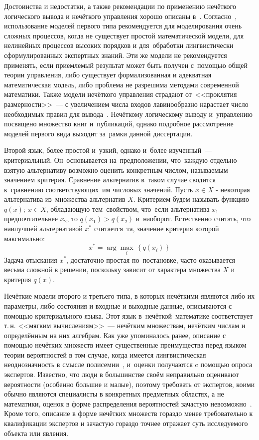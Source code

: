 Достоинства и недостатки, а также рекомендации по применению нечёткого логического вывода и нечёткого управления хорошо описаны в~\cite{Bauer_Winkler}. Согласно~\cite{Bauer_Winkler}, использование моделей первого типа рекомендуется для моделирования очень сложных процессов, когда не существует простой математической модели, для нелинейных процессов высоких порядков и для~обработки лингвистически сформулированных экспертных знаний. Эти же модели не рекомендуется применять, если приемлемый результат может быть получен с~помощью общей теории управления, либо существует формализованная и адекватная математическая модель, либо проблема не разрешима методами современной математики. Также модели нечёткого управления страдают от~<<проклятия размерности>>~--- с увеличением числа входов лавинообразно нарастает число необходимых правил для вывода~\cite{Pegat}. Нечёткому логическому выводу и~управлению посвящено множество книг и~публикаций, однако подробное рассмотрение моделей первого вида выходит за~рамки данной диссертации.

Второй язык, более простой и~узкий, однако и~более изученный~--- критериальный. Он~основывается на~предположении, что~каждую отдельно взятую альтернативу возможно оценить конкретным числом, называемым значением критерия. Сравнение альтернатив в~таком случае сводится к~сравнению соответствующих~им числовых значений. Пусть $x\in X$ - некоторая альтернатива из~множества альтернатив $X$. Критерием будем называть функцию $q\left( x \right);\ x\in X$, обладающую тем~свойством, что~если альтернатива ${x_1}$ предпочтительнее ${x_2}$, то $q\left( x_1 \right)>q\left( x_2 \right)$ и~наоборот. Естественно считать, что наилучшей альтернативой ${{x}^{*}}$ считается~та, значение критерия которой максимально:
\begin{equation*}
  x^{*}=\arg \underset{i}{\mathop{\max }}\,\left\{ q\left( x_i \right) \right\}
\end{equation*}
Задача отыскания $x^{*}$, достаточно простая по~постановке, часто оказывается весьма сложной в решении, поскольку зависит от характера множества $X$ и критерия $q\left( x \right)$. 

Нечёткие модели второго и третьего типа, в которых нечёткими являются либо их параметры, либо состояния и входные и выходные данные, описываются с помощью критериального языка. Этот язык в~нечёткой~математике соответствует т.\,н. <<мягким вычислениям>>~--- нечётким множествам, нечётким числам и определённым на них алгебрам. Как уже упоминалось ранее, описание с помощью нечётких множеств имеет существенные преимущества перед языком теории вероятностей в том случае, когда имеется лингвистическая неоднозначность в смысле полисемии~\cite{Borisov_Alexeev_Msk}, и~оценки получаются c помощью опроса экспертов. Известно, что люди в большинстве своём неправильно оценивают вероятности (особенно большие и малые), поэтому требовать от экспертов, коими обычно являются специалисты в конкретных предметных областях, а не математики, оценок в форме распределения вероятностей зачастую невозможно~\cite{Gubko}. Кроме того, описание в форме нечётких множеств гораздо менее требовательно к квалификации экспертов и зачастую гораздо точнее отражает суть исследуемого объекта или явления.

